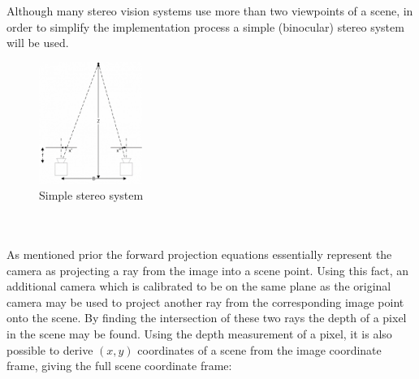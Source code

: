 \documentclass[11pt]{scrartcl}
\begin{document}
\begin{remark}
  Although many stereo vision systems use more than two viewpoints of a scene,
  in order to simplify the implementation process a simple (binocular) stereo
  system will be used.
\end{remark}
\begin{figure}
  \centering
  \includegraphics[width=0.3\textwidth]{img2.resized.png}
  \caption{\label{fig:frog2}Simple stereo system}
\end{figure}
\\
\\

As mentioned prior the forward projection equations essentially represent the camera
as projecting a ray from the image into a scene point. Using this fact, an
additional camera which is calibrated to be on the same plane as the original camera
may be used to project another ray from the corresponding image point onto the scene. By
finding the intersection of these two rays the depth of a pixel in the scene may be found. Using the depth measurement of a pixel, it is also possible to derive
$(x, y)$ coordinates of a scene from the image coordinate frame, giving
the full scene coordinate frame:
\end{document}
